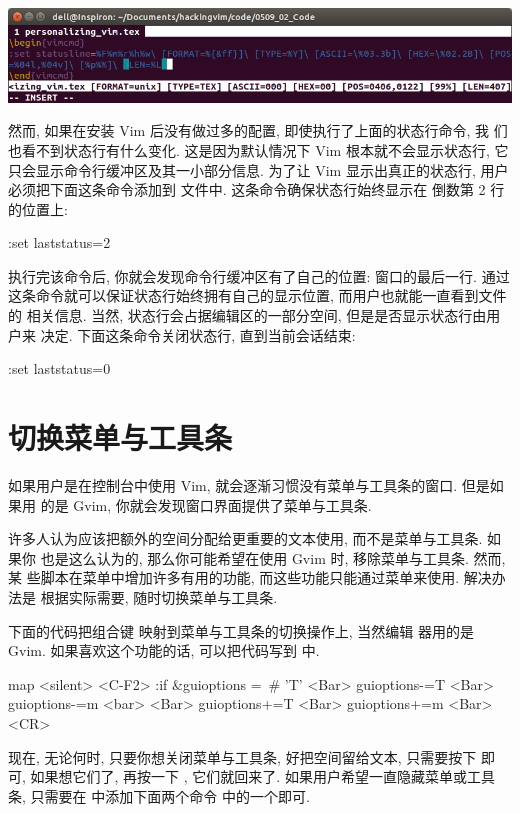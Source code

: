 \begin{center}
    \includegraphics[scale=0.8]{images/page27.png}
\end{center}
然而, 如果在安装 Vim 后没有做过多的配置, 即使执行了上面的状态行命令, 我
们也看不到状态行有什么变化. 这是因为默认情况下 Vim 根本就不会显示状态行,
它只会显示命令行缓冲区及其一小部分信息. 为了让 Vim 显示出真正的状态行, 用户
必须把下面这条命令添加到  文件中. 这条命令确保状态行始终显示在
倒数第 2 行的位置上:
\begin{vimcmd}
:set laststatus=2
\end{vimcmd}
执行完该命令后, 你就会发现命令行缓冲区有了自己的位置: 窗口的最后一行. 通过
这条命令就可以保证状态行始终拥有自己的显示位置, 而用户也就能一直看到文件的
相关信息. 当然, 状态行会占据编辑区的一部分空间, 但是是否显示状态行由用户来
决定. 下面这条命令关闭状态行, 直到当前会话结束:
\begin{vimcmd}
:set laststatus=0
\end{vimcmd}

\section{切换菜单与工具条}
\label{sec:toggle_menu_and_toolbar}
如果用户是在控制台中使用 Vim, 就会逐渐习惯没有菜单与工具条的窗口. 但是如果用
的是 Gvim, 你就会发现窗口界面提供了菜单与工具条.

许多人认为应该把额外的空间分配给更重要的文本使用, 而不是菜单与工具条. 如果你 
也是这么认为的, 那么你可能希望在使用 Gvim 时, 移除菜单与工具条. 然而, 某
些脚本在菜单中增加许多有用的功能, 而这些功能只能通过菜单来使用. 解决办法是
根据实际需要, 随时切换菜单与工具条.

下面的代码把组合键  映射到菜单与工具条的切换操作上, 当然编辑
器用的是 Gvim. 如果喜欢这个功能的话, 可以把代码写到  中.
\begin{vimcmd}
map <silent> <C-F2> :if &guioptions =~# 'T' <Bar>
                         \set guioptions-=T <Bar>
                         \set guioptions-=m <bar>
                    \else <Bar>
                         \set guioptions+=T <Bar>
                         \set guioptions+=m <Bar>
                      \endif<CR>
\end{vimcmd}
现在, 无论何时, 只要你想关闭菜单与工具条, 好把空间留给文本, 只需要按下
 即可, 如果想它们了, 再按一下 , 它们就回来了.
如果用户希望一直隐藏菜单或工具条, 只需要在  中添加下面两个命令
中的一个即可.

